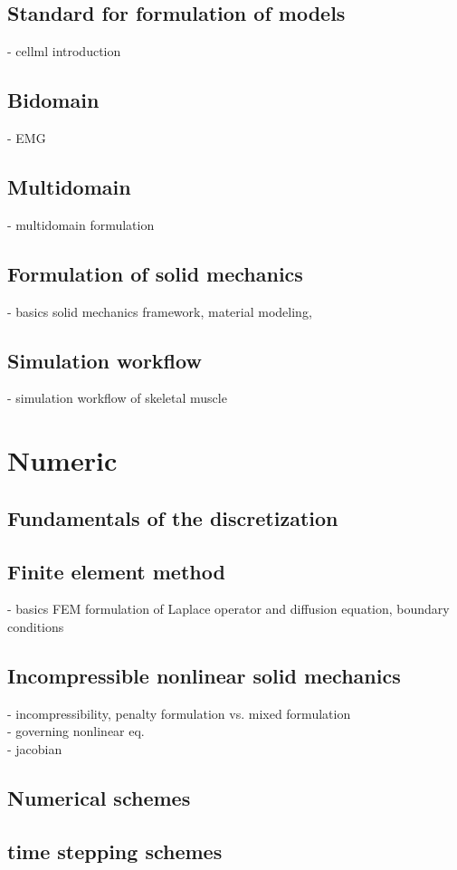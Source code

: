     \section{Standard for formulation of models}
    - cellml introduction
    \section{Bidomain}
    - EMG
    \section{Multidomain}
    - multidomain formulation
    \section{Formulation of solid mechanics}
    - basics solid mechanics framework, material modeling, 
    
  \section{Simulation workflow}
  - simulation workflow of skeletal muscle
  
  \chapter{Numeric}
  \section{Fundamentals of the discretization}
    \section{Finite element method}
    - basics FEM formulation of Laplace operator and diffusion equation, boundary conditions
    \section{Incompressible nonlinear solid mechanics}
    - incompressibility, penalty formulation vs. mixed formulation\\
    - governing nonlinear eq.\\
    - jacobian
  \section{Numerical schemes}
    \section{time stepping schemes}
